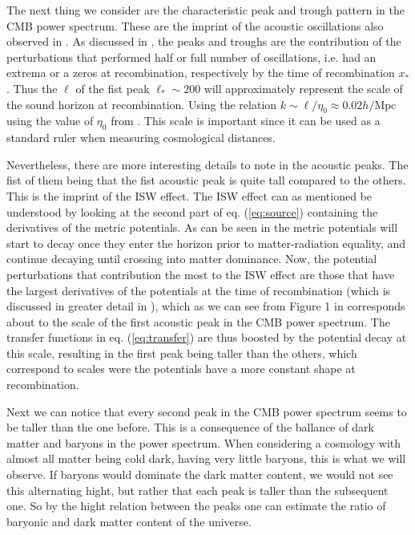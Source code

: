 \documentclass[twocolumn]{aastex62}
\begin{document}
The next thing we consider are the characteristic peak and trough pattern in the CMB power spectrum. These are the imprint of the acoustic oscillations also observed in \cite{stutzer:2020c}. As discussed in \cite{stutzer:2020c}, the peaks and troughs are the contribution of the perturbations that performed half or full number of oscillations, i.e. had an extrema or a zeros at recombination, respectively by the time of recombination $x_*$. Thus the $\ell$ of the fist peak $\ell_*\sim 200$ will approximately represent the scale of the sound horizon at recombination. Using the relation $k \sim \ell / \eta_0 \approx 0.02 h/\mathrm{Mpc}$ using the value of $\eta_0$ from \cite{stutzer:2020a}. This scale is important since it can be used as a standard ruler when measuring cosmological distances. 

Nevertheless, there are more interesting details to note in the acoustic peaks. The fist of them being that the fist acoustic peak is quite tall compared to the others. This is the imprint of the ISW effect. The ISW effect can as mentioned be understood by looking at the second part of eq. (\ref{eq:source}) containing the derivatives of the metric potentials. As can be seen in \cite{stutzer:2020c} the metric potentials will start to decay once they enter the horizon prior to matter-radiation equality, and continue decaying until crossing into matter dominance. Now, the potential perturbations that contribution the most to the ISW effect are those that have the largest derivatives of the potentials at the time of recombination (which is discussed in greater detail in \cite{dodelson:2003}), which as we can see from Figure 1 in \cite{stutzer:2020c} corresponds about to the scale of the first acoustic peak in the CMB power spectrum. The transfer functions in eq. (\ref{eq:transfer}) are thus boosted by the potential decay at this scale, resulting in the first peak being taller than the others, which correspond to scales were the potentials have a more constant shape at recombination.

Next we can notice that every second peak in the CMB power spectrum seems to be taller than the one before. This is a consequence of the ballance of dark matter and baryons in the power spectrum. When considering a cosmology with almost all matter being cold dark, having very little baryons, this is what we will observe. If baryons would dominate the dark matter content, we would not see this alternating hight, but rather that each peak is taller than the subsequent one. So by the hight relation between the peaks one can estimate the ratio of baryonic and dark matter content of the universe.
\end{document}
